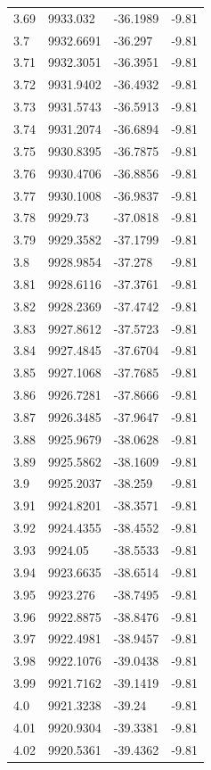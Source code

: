 \begin{table}[H]
\begin{tabular}{llll}
3.69 & 9933.032 & -36.1989 & -9.81 \\
3.7 & 9932.6691 & -36.297 & -9.81 \\
3.71 & 9932.3051 & -36.3951 & -9.81 \\
3.72 & 9931.9402 & -36.4932 & -9.81 \\
3.73 & 9931.5743 & -36.5913 & -9.81 \\
3.74 & 9931.2074 & -36.6894 & -9.81 \\
3.75 & 9930.8395 & -36.7875 & -9.81 \\
3.76 & 9930.4706 & -36.8856 & -9.81 \\
3.77 & 9930.1008 & -36.9837 & -9.81 \\
3.78 & 9929.73 & -37.0818 & -9.81 \\
3.79 & 9929.3582 & -37.1799 & -9.81 \\
3.8 & 9928.9854 & -37.278 & -9.81 \\
3.81 & 9928.6116 & -37.3761 & -9.81 \\
3.82 & 9928.2369 & -37.4742 & -9.81 \\
3.83 & 9927.8612 & -37.5723 & -9.81 \\
3.84 & 9927.4845 & -37.6704 & -9.81 \\
3.85 & 9927.1068 & -37.7685 & -9.81 \\
3.86 & 9926.7281 & -37.8666 & -9.81 \\
3.87 & 9926.3485 & -37.9647 & -9.81 \\
3.88 & 9925.9679 & -38.0628 & -9.81 \\
3.89 & 9925.5862 & -38.1609 & -9.81 \\
3.9 & 9925.2037 & -38.259 & -9.81 \\
3.91 & 9924.8201 & -38.3571 & -9.81 \\
3.92 & 9924.4355 & -38.4552 & -9.81 \\
3.93 & 9924.05 & -38.5533 & -9.81 \\
3.94 & 9923.6635 & -38.6514 & -9.81 \\
3.95 & 9923.276 & -38.7495 & -9.81 \\
3.96 & 9922.8875 & -38.8476 & -9.81 \\
3.97 & 9922.4981 & -38.9457 & -9.81 \\
3.98 & 9922.1076 & -39.0438 & -9.81 \\
3.99 & 9921.7162 & -39.1419 & -9.81 \\
4.0 & 9921.3238 & -39.24 & -9.81 \\
4.01 & 9920.9304 & -39.3381 & -9.81 \\
4.02 & 9920.5361 & -39.4362 & -9.81 \\

\end{tabular}
\end{table}
